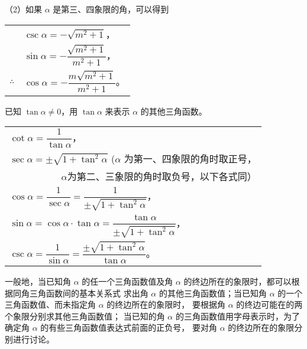 （2）如果 $\alpha$ 是第三、四象限的角，可以得到

\begin{tabular}{p{2em}l}
    & $\csc \alpha = -\sqrt{m^2 + 1}$，\\
    \rule{0pt}{2em} & $\sin \alpha = -\dfrac{\sqrt{m^2 + 1}}{m^2 + 1}$，\\
    \rule{0pt}{2em} $\therefore$ & $\cos \alpha = -\dfrac{m \sqrt{m^2 + 1}}{m^2 + 1}$。
\end{tabular}
\vspace{0.5em}

\liti 已知 $\tan \alpha \neq 0$，用 $\tan \alpha$ 来表示 $\alpha$ 的其他三角函数。

\jie \begin{tabular}[t]{l}
    \rule{0pt}{2em}$\cot \alpha = \dfrac{1}{\tan \alpha}$，\\
    \rule{0pt}{2em}$\sec \alpha = \pm \sqrt{1 + \tan^2 \alpha}$ ($\alpha$ 为第一、四象限的角时取正号， \\
        \multicolumn{1}{r}{$\alpha$为第二、三象限的角时取负号，以下各式同）}\\
    \rule{0pt}{2em}$\cos \alpha = \dfrac{1}{\sec \alpha} = \dfrac{1}{\pm \sqrt{1 + \tan^2 \alpha}}$，\\
    \rule{0pt}{2em}$\sin \alpha = \cos \alpha \cdot \tan \alpha = \dfrac{\tan \alpha}{\pm \sqrt{1 + \tan^2 \alpha}}$，\\
    \rule{0pt}{2em}$\csc \alpha = \dfrac{1}{\sin \alpha} = \dfrac{\pm \sqrt{1 + \tan^2 \alpha}}{\tan \alpha}$。\\
\end{tabular}
\vspace{0.5em}

一般地，当已知角 $\alpha$ 的任一个三角函数值及角 $\alpha$ 的终边所在的象限时，都可以根据同角三角函数间的基本关系式
求出角 $\alpha$ 的其他三角函数值；当已知角 $\alpha$ 的一个三角函数值、而未指定角 $\alpha$ 的终边所在的象限时，
要根据角 $\alpha$ 的终边可能在的两个象限分别求其他三角函数值；
当已知的角 $\alpha$ 的三角函数值用字母表示时，为了确定角 $\alpha$ 的有些三角函数值表达式前面的正负号，
要对角 $\alpha$ 的终边所在的象限分别进行讨论。

